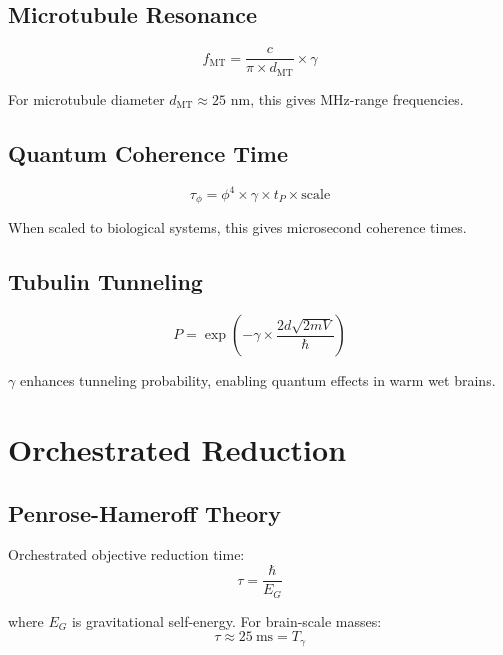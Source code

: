 \documentclass[12pt,a4paper]{article}
\begin{document}
\subsection{Microtubule Resonance}

\begin{equation}
f_{\text{MT}} = \frac{c}{\pi \times d_{\text{MT}}} \times \gamma
\end{equation}

For microtubule diameter $d_{\text{MT}} \approx 25$ nm, this gives MHz-range frequencies.

\subsection{Quantum Coherence Time}

\begin{equation}
\tau_\phi = \phi^4 \times \gamma \times t_P \times \text{scale}
\end{equation}

When scaled to biological systems, this gives microsecond coherence times.

\subsection{Tubulin Tunneling}

\begin{equation}
P = \exp\left(-\gamma \times \frac{2d\sqrt{2mV}}{\hbar}\right)
\end{equation}

$\gamma$ enhances tunneling probability, enabling quantum effects in warm wet brains.

\section{Orchestrated Reduction}

\subsection{Penrose-Hameroff Theory}

Orchestrated objective reduction time:
\begin{equation}
\tau = \frac{\hbar}{E_G}
\end{equation}

where $E_G$ is gravitational self-energy. For brain-scale masses:
\begin{equation}
\tau \approx 25~\text{ms} = T_\gamma
\end{equation}
\end{document}
